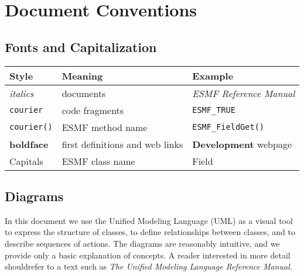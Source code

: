 \section{Document Conventions}
\label{sec:conventions}

\subsection{Fonts and Capitalization}

\begin{tabular}{lll}
{\bf Style} & {\bf Meaning} & {\bf Example} \\ \hline
{\it italics}  & documents & {\it ESMF Reference Manual}\\
{\tt courier}  & code fragments & {\tt ESMF\_TRUE}\\
{\tt courier()}  & ESMF method name & {\tt ESMF\_FieldGet()} \\
{\bf boldface} & first definitions and web links & {\bf Development} webpage \\
{Capitals}     & ESMF class name & Field \\
\end{tabular}

\subsection{Diagrams}

In this document we use the Unified Modeling Language (UML) as a visual tool 
to express the structure of 
classes, to define relationships between classes, and to describe sequences
of actions.  The diagrams are reasonably intuitive, and we provide 
only a basic explanation of concepts.  A reader interested in more detail shouldrefer to a text such as {\it The Unified Modeling Language Reference Manual.}
 \cite{uml}





